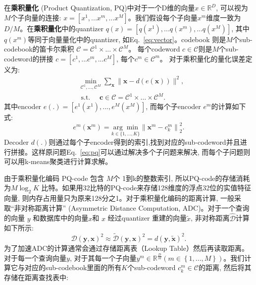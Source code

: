 在\textbf{乘积量化} (Product Quantization, PQ)中对于一个D维的向量$x \in \mathbb{R}^D$, 可以视为$M$个子向量的连接: $x = \left[ x^1,...x^m,...x^M \right]$。我们假设每个子向量$x^m$维度一致为$D/M$。在\textbf{乘积量化}中的quantizer $q(x) = \left[ q(x^1),...q(x^m),...q(x^M) \right]$, 其中 $q(x^m)$等同于向量量化中的quantizer, 如Eq.~\ref{eq:vector}。codebook 则是$M$个sub-codebook的笛卡尔乘积 $\mathcal{C} = \mathcal{C}^1 \times ... \times \mathcal{C}^M$。 每个codeword $c \in \mathcal{C}$则是$M$个sub-codeword的拼接 $c = \left[ c^1,...c^m,...c^M\right]$, 每个$c^m \in \mathcal{C}^m$。 对于乘积量化的量化误差定义为:
\begin{equation}
    \begin{aligned}
        & \min _{\mathcal{C}^1, \ldots, \mathcal{C}^M} \sum_{\mathbf{x}}\|\mathbf{x}-d(e(\mathbf{x}))\|^2, \\
        & \text { s.t. } \quad \mathbf{c} \in \mathcal{C}=\mathcal{C}^1 \times \ldots \times \mathcal{C}^M .
        \label{eq:pq}
        \end{aligned}
\end{equation}
其中encoder $e(.) = \left[ e^1(x^1) ,..., e^M(x^M)\right]$, 而每个子encoder $e^m$的计算如下式:
\begin{equation}
    e^m\left(\mathbf{x}^m\right)=\underset{k \in\{1, \ldots, K\}}{\arg \min }\left\|\mathbf{x}^m-c_k^m\right\|_2^2.
\end{equation}
Decoder $d(.)$则通过每个子encoder得到的索引,找到对应的sub-codeword并且进行拼接。这样原问题Eq.~\ref{eq:pq}可以通过解决多个子问题来解决, 而每个子问题则可以用k-means聚类进行计算求解。 \par
由于乘积量化编码 PQ-code 包含 $M$个 1到k的整数索引, 所以PQ-code的存储消耗为$M\log_2K$ 比特。如果用32比特的PQ-code来存储128维度的浮点32位的实值特征向量, 则内存占用量只为原来128分之1。对于乘积量化编码的距离计算, 一般采取``非对称距离计算'' (Asymmetric Distance Computation, ADC)。对于一个查询的向量 $y$ 和数据库中的向量$x$和 $x$ 经过quantizer 重建的向量$\tilde{x}$, 非对称距离$\hat{\mathcal{D}}$计算如下所示:
\begin{equation}
    \mathcal{D}(\mathbf{y}, \mathbf{x})^2 \approx \tilde{\mathcal{D}}(\mathbf{y}, \mathbf{x})^2=d(\mathbf{y}, \tilde{\mathbf{x}})^2.
\end{equation}
为了加速ADC的计算通常会通过存储距离表（Lookup Table）然后再读取距离。对于每一个查询向量$y$, 对于其每一个子向量$y^m \in \mathbb{R}^{\frac{D}{M}} (m \in \left \{ 1,...,M  \right \})$。我们计算它与对应的sub-codebook里面的所有$K$个sub-codeword $c_k^m \in \mathcal{C}$的距离, 然后将其存储在距离查找表中:
